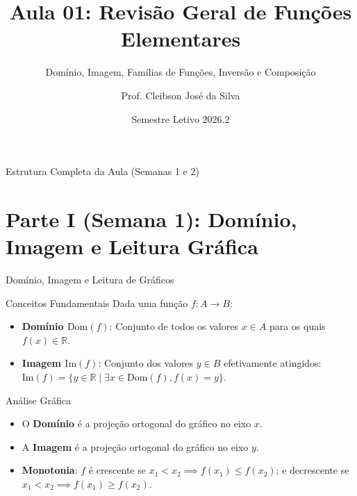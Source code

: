 \documentclass[10pt, aspectratio=169]{beamer}
\title[Cálculo I -- Aula 01]{Aula 01: Revisão Geral de Funções Elementares}
\subtitle{Domínio, Imagem, Famílias de Funções, Inversão e Composição}
\author[Prof. Cleibson]{Prof. Cleibson José da Silva}
\institute[IFPE]{Instituto Federal de Pernambuco -- Campus Caruaru\\ Bacharelado em Engenharia Mecânica}
\date{Semestre Letivo 2026.2}
\begin{document}
\transdissolve

\begin{frame}
    \titlepage
\end{frame}

\begin{frame}{Estrutura Completa da Aula (Semanas 1 e 2)}
    \tableofcontents
\end{frame}

\section{Parte I (Semana 1): Domínio, Imagem e Leitura Gráfica}

\begin{frame}{Domínio, Imagem e Leitura de Gráficos}
    \transblindshorizontal %
    \begin{block}{Conceitos Fundamentais}
        Dada uma função $f: A \to B$:
        \begin{itemize}
            \item \textbf{Domínio $\text{Dom}(f)$}: Conjunto de todos os valores $x \in A$ para os quais $f(x) \in \mathbb{R}$.
            \pause
            \item \textbf{Imagem $\text{Im}(f)$}: Conjunto dos valores $y \in B$ efetivamente atingidos: $\text{Im}(f) = \{y \in \mathbb{R} \mid \exists x \in \text{Dom}(f), f(x) = y\}$.
        \end{itemize}
    \end{block}

    \pause
    \begin{exampleblock}{Análise Gráfica}
        \begin{itemize}
            \item O \textbf{Domínio} é a projeção ortogonal do gráfico no eixo $x$.
            \item A \textbf{Imagem} é a projeção ortogonal do gráfico no eixo $y$.
            \pause
            \item \textbf{Monotonia}: $f$ é crescente se $x_1 < x_2 \implies f(x_1) \le f(x_2)$; e decrescente se $x_1 < x_2 \implies f(x_1) \ge f(x_2)$.
        \end{itemize}
    \end{exampleblock}
\end{frame}
\end{document}
